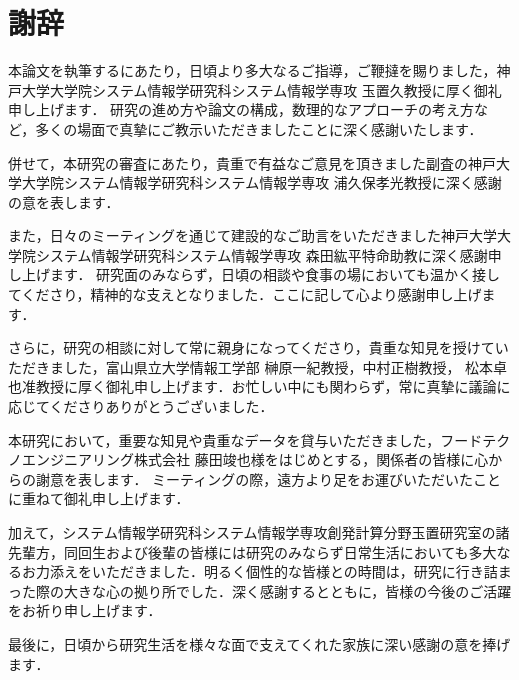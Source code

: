 
\chapter*{謝辞}
本論文を執筆するにあたり，日頃より多大なるご指導，ご鞭撻を賜りました，神戸大学大学院システム情報学研究科システム情報学専攻 玉置久教授に厚く御礼申し上げます．
研究の進め方や論文の構成，数理的なアプローチの考え方など，多くの場面で真摯にご教示いただきましたことに深く感謝いたします．

併せて，本研究の審査にあたり，貴重で有益なご意見を頂きました副査の神戸大学大学院システム情報学研究科システム情報学専攻 浦久保孝光教授に深く感謝の意を表します．

また，日々のミーティングを通じて建設的なご助言をいただきました神戸大学大学院システム情報学研究科システム情報学専攻 森田紘平特命助教に深く感謝申し上げます．
研究面のみならず，日頃の相談や食事の場においても温かく接してくださり，精神的な支えとなりました．ここに記して心より感謝申し上げます．

さらに，研究の相談に対して常に親身になってくださり，貴重な知見を授けていただきました，富山県立大学情報工学部 榊原一紀教授，中村正樹教授，
松本卓也准教授に厚く御礼申し上げます．お忙しい中にも関わらず，常に真摯に議論に応じてくださりありがとうございました．

本研究において，重要な知見や貴重なデータを貸与いただきました，フードテクノエンジニアリング株式会社 藤田竣也様をはじめとする，関係者の皆様に心からの謝意を表します．
ミーティングの際，遠方より足をお運びいただいたことに重ねて御礼申し上げます．

加えて，システム情報学研究科システム情報学専攻創発計算分野玉置研究室の諸先輩方，同回生および後輩の皆様には研究のみならず日常生活においても多大なるお力添えをいただきました．明るく個性的な皆様との時間は，研究に行き詰まった際の大きな心の拠り所でした．深く感謝するとともに，皆様の今後のご活躍をお祈り申し上げます．

最後に，日頃から研究生活を様々な面で支えてくれた家族に深い感謝の意を捧げます．
\newpage


 
